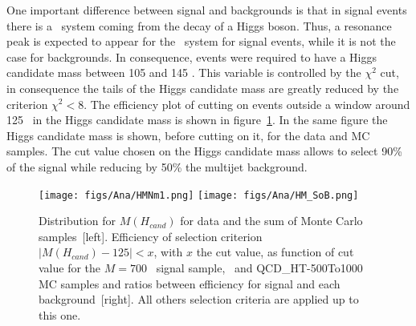 %
%
One important difference between signal and backgrounds is that in signal events there is a \bbbar~system coming from the decay of a Higgs boson. Thus, a resonance peak is expected to appear for the \bbbar~system for signal events, while it is not the case for backgrounds. In consequence, events were required to have a Higgs candidate mass between 105 and 145 \GeVcc. This variable is controlled by the $\chi^{2}$ cut, in consequence the tails of the Higgs candidate mass are greatly reduced by the criterion $\chi^{2}<8$. The efficiency plot of cutting on events outside a window around 125 \GeVcc~in the Higgs candidate mass is shown in figure~\ref{fig:HiggsMassDMC}. In the same figure the Higgs candidate mass is shown, before cutting on it, for the data and MC samples. The cut value chosen on the Higgs candidate mass allows to select 90\% of the signal while reducing by 50\% the multijet background. 

\begin{figure}[!Hhtbp]
  \begin{center}
    \texttt{[image: figs/Ana/HMNm1.png]}
    \texttt{[image: figs/Ana/HM\_SoB.png]}
    \caption{Distribution for $M(H_{cand})$ for data and the sum of Monte Carlo samples~[left]. Efficiency of selection criterion $|M(H_{cand})-125|<x$, with $x$ the cut value, as function of cut value for the $M=700$ \GeVcc~signal sample, \ttbar~and QCD\_HT-500To1000 MC samples and ratios between efficiency for signal and each background~[right]. All others selection criteria are applied up to this one.}
    \label{fig:HiggsMassDMC}
  \end{center}
\end{figure}

